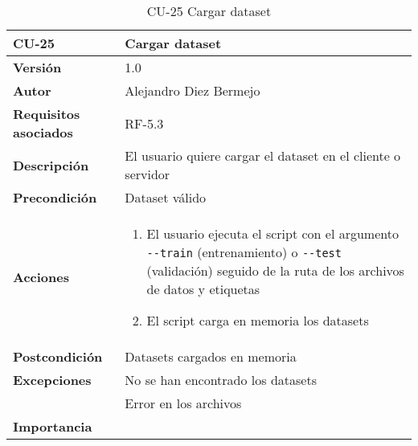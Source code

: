 \begin{table}[p]
	\centering
	\begin{tabularx}{\linewidth}{ p{} p{} }
		\toprule
		\textbf{CU-25}    & \textbf{Cargar dataset}\\
		\toprule
		\textbf{Versión}              & 1.0    \\
		\textbf{Autor}                & Alejandro Diez Bermejo \\
		\textbf{Requisitos asociados} & RF-5.3 \\
		\textbf{Descripción}          & El usuario quiere cargar el dataset en el cliente o servidor \\
        \textbf{Precondición}         & Dataset válido \\
		\textbf{Acciones}             &
		\begin{enumerate}
			\def\labelenumi{\arabic{enumi}.}
			\tightlist
            \item El usuario ejecuta el script con el argumento \texttt{-{}-train} (entrenamiento) o \texttt{-{}-test} (validación) seguido de la ruta de los archivos de datos y etiquetas
            \item El script carga en memoria los datasets
		\end{enumerate}\\
		\textbf{Postcondición}        & Datasets cargados en memoria \\
		\textbf{Excepciones}          & No se han encontrado los datasets \\
                                      & Error en los archivos \\
		\textbf{Importancia}          &  \\
		\bottomrule
	\end{tabularx}
	\caption{CU-25 Cargar dataset}
\end{table}

